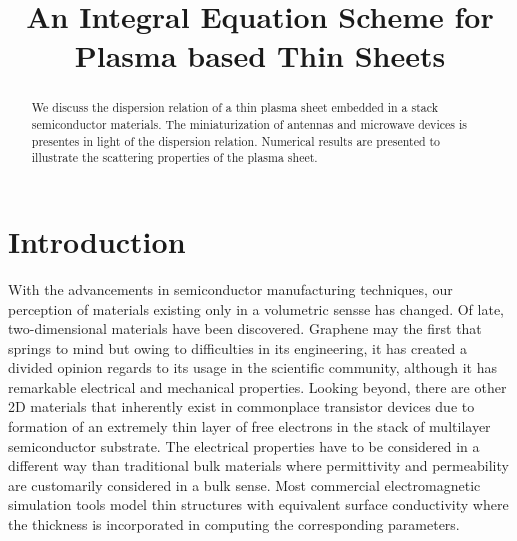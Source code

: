 \documentclass[conference, 10pt]{IEEEtran}
\renewcommand{\^}{\hat}  %
\begin{document}
\title{An Integral Equation Scheme for Plasma based Thin Sheets}


\author{
\and
{}
}
\maketitle


%
\begin{abstract}
  We discuss the dispersion relation of a thin plasma sheet embedded in a stack semiconductor materials. The miniaturization of antennas and microwave devices is presentes in light of the dispersion relation. Numerical results are presented to illustrate the scattering properties of the plasma sheet.
\end{abstract}

\IEEEpeerreviewmaketitle
\section{Introduction}
With the advancements in semiconductor manufacturing techniques, our perception of materials existing only in a volumetric sensse has changed. Of late, two-dimensional materials have been discovered. Graphene may the first that springs to mind but owing to difficulties in its engineering, it has created a divided opinion regards to its usage in the scientific community, although it has remarkable electrical and mechanical properties. Looking beyond, there are other 2D materials that inherently exist in commonplace transistor devices due to formation of an extremely thin layer of free electrons in the stack of multilayer semiconductor substrate. The electrical properties have to be considered in a different way than traditional bulk materials where permittivity and permeability are customarily considered in a bulk sense. Most commercial electromagnetic simulation tools model thin structures with equivalent surface conductivity where the thickness is incorporated in computing the corresponding parameters.
\end{document}
